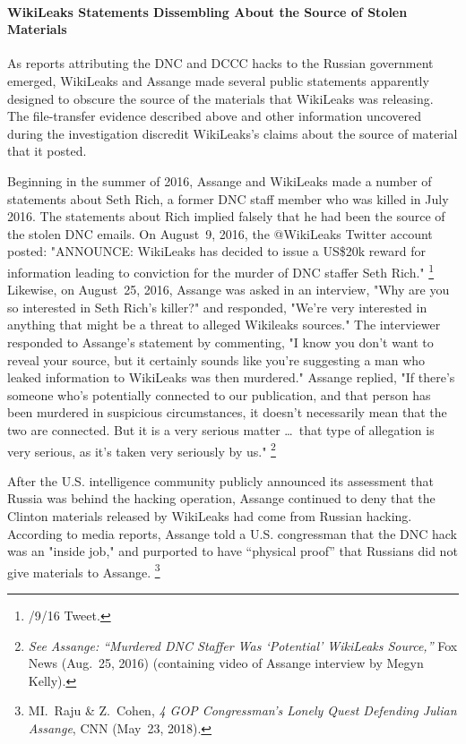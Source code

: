 \paragraph{WikiLeaks Statements Dissembling About the Source of Stolen Materials}

As reports attributing the DNC and DCCC hacks to the Russian government emerged, WikiLeaks and Assange made several public statements apparently designed to obscure the source of the materials that WikiLeaks was  releasing.
The file-transfer evidence described above and other information uncovered during the investigation discredit WikiLeaks's claims about the source of material that it posted.

Beginning in the summer of 2016, Assange and WikiLeaks made a number of statements about Seth Rich, a former DNC staff member who was killed in July 2016.
The statements about Rich implied falsely that he had been the source of the stolen DNC emails.
On August~9, 2016, the @WikiLeaks Twitter account posted: "ANNOUNCE: WikiLeaks has decided to issue a US\$20k reward for information leading to conviction for the murder of DNC staffer Seth Rich."%
\footnote{/9/16 Tweet.}
Likewise, on August~25, 2016, Assange was asked in an interview, "Why are you so interested in Seth Rich's killer?" and responded, "We're very interested in anything that might be a threat to alleged Wikileaks sources."
The interviewer responded to Assange's statement by commenting, "I know you don't want to reveal your source, but it certainly sounds like you're suggesting a man who leaked information to WikiLeaks was then murdered."
Assange replied, "If there's someone who's potentially connected to our publication, and that person has been murdered in suspicious circumstances, it doesn't necessarily mean that the two are connected.
But it is a very serious matter \dots\ that type of allegation is very serious, as it's taken very seriously by us."%
\footnote{\textit{See Assange: ``Murdered DNC Staffer Was `Potential' WikiLeaks Source,''} Fox News (Aug.~25, 2016) (containing video of Assange interview by Megyn Kelly).}

After the U.S. intelligence community publicly announced its assessment that Russia was behind the hacking operation, Assange continued to deny that the Clinton materials released by WikiLeaks had come from Russian hacking.
According to media reports, Assange told a U.S. congressman that the DNC hack was an "inside job," and purported to have ``physical proof\thinspace'' that Russians did not give materials to Assange.%
\footnote{MI.~Raju \& Z.~Cohen, \textit{4 GOP Congressman's Lonely Quest Defending Julian Assange}, CNN (May~23, 2018).}

